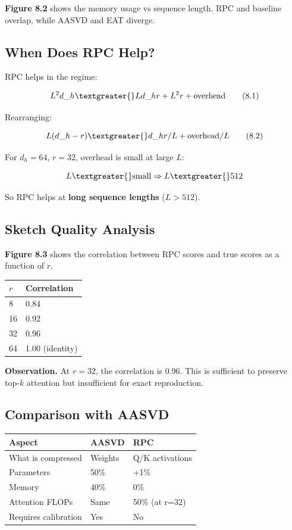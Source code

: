 \textbf{Figure 8.2} shows the memory usage vs sequence length. RPC and baseline 
overlap, while AASVD and EAT diverge.

\subsection{When Does RPC Help?}

RPC helps in the regime:

\[
L^2 d\_h \textgreater{} L d\_h r + L^2 r + \text{overhead}
\tag{8.1}
\]

Rearranging:

\[
L (d\_h - r) \textgreater{} d\_h r / L + \text{overhead} / L
\tag{8.2}
\]

For $d_h = 64$, $r = 32$, overhead is small at large $L$:

\[
L \textgreater{} \text{small} \Rightarrow L \textgreater{} 512
\]

So RPC helps at \textbf{long sequence lengths} ($L > 512$).

\subsection{Sketch Quality Analysis}

\textbf{Figure 8.3} shows the correlation between RPC scores and true scores as 
a function of $r$.

\begin{table}[H]
\centering
\small
\begin{tabular}{ll}
\toprule
\textbf{$r$} & \textbf{Correlation} \\
\midrule
8 & 0.84 \\
16 & 0.92 \\
32 & 0.96 \\
64 & 1.00 (identity) \\
\bottomrule
\end{tabular}
\end{table}

\textbf{Observation.} At $r = 32$, the correlation is 0.96. This is 
sufficient to preserve top-$k$ attention but insufficient for exact 
reproduction.

\subsection{Comparison with AASVD}

\begin{table}[H]
\centering
\small
\begin{tabular}{lll}
\toprule
\textbf{Aspect} & \textbf{AASVD} & \textbf{RPC} \\
\midrule
What is compressed & Weights & Q/K activations \\
Parameters & 50\% & +1\% \\
Memory & 40\% & 0\% \\
Attention FLOPs & Same & 50\% (at r=32) \\
Requires calibration & Yes & No \\
\bottomrule
\end{tabular}
\end{table}

